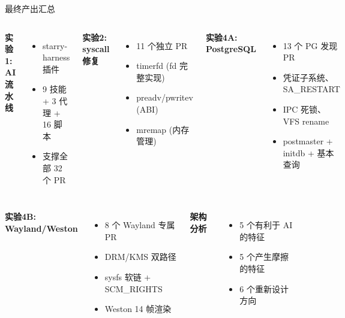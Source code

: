 \documentclass[aspectratio=169,10pt]{ctexbeamer}
\begin{document}
\begin{frame}[fragile]{最终产出汇总}
\small
\begin{columns}[T]
\textbf{实验1: AI 流水线}
\begin{itemize}
  \item starry-harness 插件
  \item 9 技能 + 3 代理 + 16 脚本
  \item 支撑全部 32 个 PR
\end{itemize}

\textbf{实验2: syscall 修复}
\begin{itemize}
  \item 11 个独立 PR
  \item timerfd (fd 完整实现)
  \item preadv/pwritev (ABI)
  \item mremap (内存管理)
\end{itemize}

\textbf{实验4A: PostgreSQL}
\begin{itemize}
  \item 13 个 PG 发现 PR
  \item 凭证子系统、SA\_RESTART
  \item IPC 死锁、VFS rename
  \item postmaster + initdb + 基本查询
\end{itemize}
\end{columns}

\vspace{1mm}
\begin{columns}[T]
\textbf{实验4B: Wayland/Weston}
\begin{itemize}
  \item 8 个 Wayland 专属 PR
  \item DRM/KMS 双路径
  \item sysfs 软链 + SCM\_RIGHTS
  \item Weston 14 帧渲染
\end{itemize}

\textbf{架构分析}
\begin{itemize}
  \item 5 个有利于 AI 的特征
  \item 5 个产生摩擦的特征
  \item 6 个重新设计方向
\end{itemize}

\vspace{1mm}
\begin{center}
\end{center}
\end{columns}
\end{frame}
\end{document}
